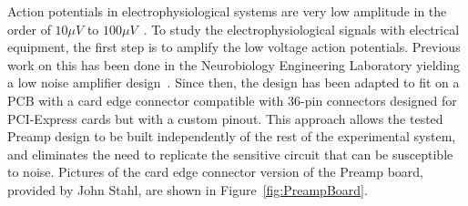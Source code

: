 Action potentials in electrophysiological systems are very low amplitude in the order of $10\unit{\mu V}$ to $100\unit{\mu V}$~\cite{Potter2005}.  To study the electrophysiological signals with electrical equipment, the first step is to amplify the low voltage action potentials.  Previous work on this has been done in the Neurobiology Engineering Laboratory yielding a low noise amplifier design~\cite{StahlMSEE,BatzerCorsiCrampton}.  Since then, the design has been adapted to fit on a PCB with a card edge connector compatible with 36-pin connectors designed for PCI-Express cards but with a custom pinout.  This approach allows the tested Preamp design to be built independently of the rest of the experimental system, and eliminates the need to replicate the sensitive circuit that can be susceptible to noise.  Pictures of the card edge connector version of the Preamp board, provided by John Stahl, are shown in Figure~\ref{fig:PreampBoard}.

